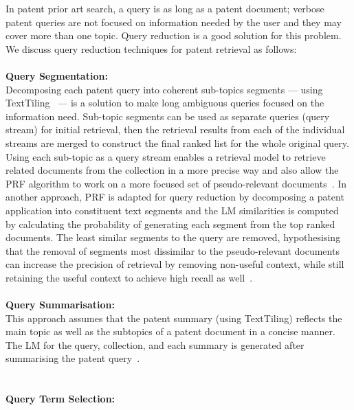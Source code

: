In patent prior art search, a query is as long as a patent document; verbose patent queries are not focused on information needed by the user and they may cover more than one topic. Query reduction is a good solution for this problem. We discuss query reduction techniques for patent retrieval as follows:
\\\\
\textbf{Query Segmentation:} 
\ \\
Decomposing each patent query into coherent sub-topics segments --- using TextTiling~\citep{hearst1997texttiling} --- is a solution to make long ambiguous queries focused on the information need. Sub-topic segments can be used as separate queries (query stream) for initial retrieval, then the retrieval results from each of the individual streams are merged to construct the final ranked list for the whole original query. Using each sub-topic as a query stream enables a retrieval model to retrieve related documents from the collection in a more precise way and also allow the PRF algorithm to work on a more focused set of pseudo-relevant documents~\citep{takaki2004associative, ganguly2011united}. In another approach, PRF is adapted for query reduction by decomposing a patent application into constituent text segments and the LM similarities is computed by calculating the probability of generating each segment from the top ranked documents. The least similar segments to the query are removed, hypothesising that the removal of segments most dissimilar to the pseudo-relevant documents can increase the precision of retrieval by removing non-useful context, while still retaining the useful context to achieve high recall as well~\citep{ganguly2011patent}.
\\\\
\textbf{Query Summarisation:} 
\ \\
This approach assumes that the patent summary (using TextTiling) reflects the main topic as well as the subtopics of a patent document in a concise manner. The LM for the query, collection, and each summary is generated after summarising the patent query~\citep{mahdabi2011report}. 
\\\\\\
\textbf{Query Term Selection:}
\ \\

